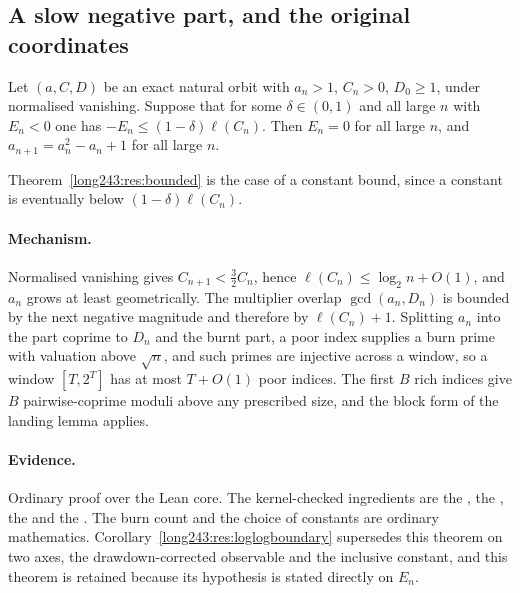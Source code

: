 \documentclass[11pt]{article}
\begin{document}
\subsection{A slow negative part, and the original coordinates}

\begin{theorem}\label{long243:res:slownegative}
Let $(a,C,D)$ be an exact natural orbit with $a_n>1$, $C_n>0$, $D_0\ge1$, under
normalised vanishing.  Suppose that for some $\delta\in(0,1)$ and all large $n$
with $E_n<0$ one has $-E_n\le(1-\delta)\ell(C_n)$.  Then $E_n=0$ for all large
$n$, and $a_{n+1}=a_n^2-a_n+1$ for all large $n$.
\end{theorem}

\noindent Theorem~\ref{long243:res:bounded} is the case of a constant bound, since a
constant is eventually below $(1-\delta)\ell(C_n)$.

\paragraph{Mechanism.}
Normalised vanishing gives $C_{n+1}<\tfrac32C_n$, hence
$\ell(C_n)\le\log_2n+O(1)$, and $a_n$ grows at least geometrically.  The
multiplier overlap $\gcd(a_n,D_n)$ is bounded by the next negative magnitude and
therefore by $\ell(C_n)+1$.  Splitting $a_n$ into the part coprime to $D_n$ and
the burnt part, a poor index supplies a burn prime with valuation above
$\sqrt n$, and such primes are injective across a window, so a window
$[T,2^T]$ has at most $T+O(1)$ poor indices.  The first $B$ rich indices give
$B$ pairwise-coprime moduli above any prescribed size, and the block form of the
landing lemma applies.

\paragraph{Evidence.}
Ordinary proof over the Lean core.  The kernel-checked ingredients are the
, the
, the
 and
the
.  The burn count and the choice of constants are ordinary
mathematics.  Corollary~\ref{long243:res:loglogboundary} supersedes this theorem on two
axes, the drawdown-corrected observable and the inclusive constant, and this
theorem is retained because its hypothesis is stated directly on $E_n$.
\end{document}
